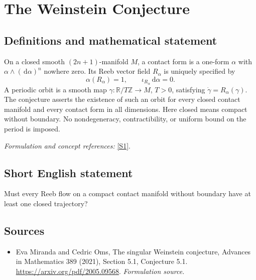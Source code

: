 \documentclass[11pt]{article}
\begin{document}
\section*{\texorpdfstring{The Weinstein Conjecture}{The Weinstein Conjecture}}\label{1141}
\subsection{Definitions and mathematical statement}
On a closed smooth $(2n+1)$-manifold $M$, a contact form is a one-form $\alpha$ with $\alpha\wedge({\,\mathrm{d}}\alpha)^n$ nowhere zero. Its Reeb vector field $R_\alpha$ is uniquely specified by
\[
 \alpha(R_\alpha)=1,\qquad \iota_{R_\alpha}{\,\mathrm{d}}\alpha=0.
\]
A periodic orbit is a smooth map $\gamma:{\mathbb{R}}/T{\mathbb{Z}}\to M$, $T>0$, satisfying $\dot\gamma=R_\alpha(\gamma)$. The conjecture asserts the existence of such an orbit for every closed contact manifold and every contact form in all dimensions. Here closed means compact without boundary. No nondegeneracy, contractibility, or uniform bound on the period is imposed.
\par\smallskip\textit{Formulation and concept references:} \href{https://arxiv.org/pdf/2005.09568}{[S1]}.

\subsection{Short English statement}
Must every Reeb flow on a compact contact manifold without boundary have at least one closed trajectory?
\subsection{Sources}
\begin{itemize}
\item[S1]Eva Miranda and Cedric Oms, The singular Weinstein conjecture, Advances in Mathematics 389 (2021), Section 5.1, Conjecture 5.1.
\url{https://arxiv.org/pdf/2005.09568}.
\textit{Formulation source.}
\end{itemize}
\end{document}
